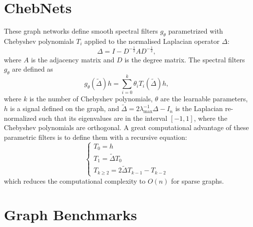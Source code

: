 \documentclass[letterpaper]{article} \usepackage{aaai21}  \usepackage{times}  \usepackage{helvet} \usepackage{courier}  \usepackage[hyphens]{url}  \usepackage{graphicx} \usepackage{natbib}  \usepackage{caption} \frenchspacing  \setlength{\pdfpagewidth}{8.5in}  \setlength{\pdfpageheight}{11in}
\begin{document}
\section{ChebNets \cite{defferrard_convolutional_nodate}}
These graph networks define smooth spectral filters $g_{\theta}$ parametrized with Chebyshev polynomials $T_i$ applied to the normalised Laplacian operator $\Delta$:
\begin{equation}
   \Delta =I - D^{-\frac{1}{2}} A D^{-\frac{1}{2}},
\end{equation}
where $A$ is the adjacency matrix and $D$ is the degree matrix. The spectral filters $g_{\theta}$ are defined as
\begin{equation}
    g_{\theta} (\tilde{\Delta})h= \sum_{i=0}^k \theta_i T_i(\tilde{\Delta}) h,
		\label{eq:learnedfilterscheb}
\end{equation}
where $k$ is the number of Chebyshev polynomials, $\theta$ are the learnable parameters, $h$ is a signal defined on the graph, and $\tilde{\Delta} = 2\lambda_{\textrm{max}}^{-1}\Delta − I_n$ is the Laplacian re-normalized such that its eigenvalues are in the interval $[-1,1]$, where the Chebyshev polynomials are orthogonal. A great computational advantage of these parametric filters is to define them with a recursive equation:
\begin{equation}
    \begin{cases} T_0 = h \\T_1 = \tilde{\Delta}T_0 \\ T_{k\geq2} = 2\tilde{\Delta}T_{k-1}-T_{k-2} \end{cases}
    \label{eq:recursT}
\end{equation}
which reduces the computational complexity to $O(n)$ for sparse graphs.


























\section{Graph Benchmarks}
\end{document}
